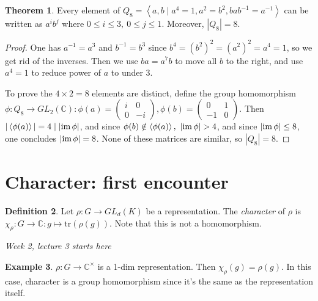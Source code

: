 \documentclass[a4paper]{article}
\newcommand{\tr}{\text{tr}}
\newcommand{\la}{\left\langle}
\newcommand{\ra}{\right\rangle}
\newcommand{\C}{\mathbb{C}}
\newcommand{\im}{\text{im\,}}
\theoremstyle{definition}
\newtheorem{defn}{Definition}[subsection]
\newtheorem{thm}[defn]{Theorem}
\newtheorem{example}[defn]{Example}
\begin{document}
\begin{thm}
Every element of $Q_8=\la a,b \mid a^4=1,a^2=b^2,bab^{-1}=a^{-1}\ra$ can be written as $a^ib^j$ where $0\leq i\leq 3,\ 0\leq j\leq 1$. Moreover, $|Q_8|=8$.
\end{thm}
\begin{proof}
One has $a^{-1}=a^3$ and $b^{-1}=b^3$ since $b^4=(b^2)^2=(a^2)^2=a^4=1$, so we get rid of the inverses. Then we use $ba=a^7b$ to move all $b$ to the right, and use $a^4=1$ to reduce power of $a$ to under 3.

To prove the $4\times 2=8$ elements are distinct, define the group homomorphism $\phi:Q_8\rightarrow GL_2(\C):\phi(a)=\begin{pmatrix}i&0\\0&-i\end{pmatrix},\phi(b)=\begin{pmatrix}0&1\\-1&0\end{pmatrix}$. Then $|\la\phi(a)\ra|=4\mid |\im\phi|$, and since $\phi(b)\notin\la\phi(a)\ra,\ |\im\phi|>4$, and since $|\im\phi|\leq 8$, one concludes $|\im\phi|=8$. None of these matrices are similar, so $|Q_8|=8$.
\end{proof}

\section{Character: first encounter}
\begin{defn}
Let $\rho:G\rightarrow GL_d(K)$ be a representation. The \textit{character} of $\rho$ is $\chi_\rho:G\rightarrow\C:g\mapsto\tr(\rho(g))$. Note that this is not a homomorphism.
\end{defn}

\begin{flushright}
\textit{Week 2, lecture 3 starts here}
\end{flushright}

\begin{example}
$\rho:G\rightarrow \C^\times$ is a 1-dim representation. Then $\chi_\rho(g)=\rho(g)$. In this case, character is a group homomorphism since it's the same as the representation itself.
\end{example}
\end{document}

